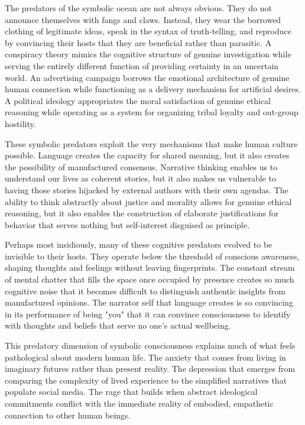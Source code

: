 The predators of the symbolic ocean are not always obvious. They do not announce themselves with fangs and claws. Instead, they wear the borrowed clothing of legitimate ideas, speak in the syntax of truth-telling, and reproduce by convincing their hosts that they are beneficial rather than parasitic. A conspiracy theory mimics the cognitive structure of genuine investigation while serving the entirely different function of providing certainty in an uncertain world. An advertising campaign borrows the emotional architecture of genuine human connection while functioning as a delivery mechanism for artificial desires. A political ideology appropriates the moral satisfaction of genuine ethical reasoning while operating as a system for organizing tribal loyalty and out-group hostility.

These symbolic predators exploit the very mechanisms that make human culture possible. Language creates the capacity for shared meaning, but it also creates the possibility of manufactured consensus. Narrative thinking enables us to understand our lives as coherent stories, but it also makes us vulnerable to having those stories hijacked by external authors with their own agendas. The ability to think abstractly about justice and morality allows for genuine ethical reasoning, but it also enables the construction of elaborate justifications for behavior that serves nothing but self-interest disguised as principle.

Perhaps most insidiously, many of these cognitive predators evolved to be invisible to their hosts. They operate below the threshold of conscious awareness, shaping thoughts and feelings without leaving fingerprints. The constant stream of mental chatter that fills the space once occupied by presence creates so much cognitive noise that it becomes difficult to distinguish authentic insights from manufactured opinions. The narrator self that language creates is so convincing in its performance of being "you" that it can convince consciousness to identify with thoughts and beliefs that serve no one's actual wellbeing.

This predatory dimension of symbolic consciousness explains much of what feels pathological about modern human life. The anxiety that comes from living in imaginary futures rather than present reality. The depression that emerges from comparing the complexity of lived experience to the simplified narratives that populate social media. The rage that builds when abstract ideological commitments conflict with the immediate reality of embodied, empathetic connection to other human beings.

